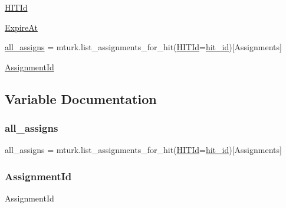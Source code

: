 \begin{DoxyCompactItemize}
\mbox{\hyperlink{namespacedelete__hits_a0db29e7cb8ba641a52d4d38422671994}{H\+I\+T\+Id}}
\item 
\mbox{\hyperlink{namespacedelete__hits_a0e3725708c99cd38fdc53655be3fde4a}{Expire\+At}}
\item 
\mbox{\hyperlink{namespacedelete__hits_a39d5a13a12424291e1fc92872174d3d5}{all\+\_\+assigns}} = mturk.\+list\+\_\+assignments\+\_\+for\+\_\+hit(\mbox{\hyperlink{namespacedelete__hits_a0db29e7cb8ba641a52d4d38422671994}{H\+I\+T\+Id}}=\mbox{\hyperlink{namespacedelete__hits_a8666d258bbc7373ec4916e210f207935}{hit\+\_\+id}})\mbox{[}\textquotesingle{}Assignments\textquotesingle{}\mbox{]}
\item 
\mbox{\hyperlink{namespacedelete__hits_ac8dbc8174bf3d4c67f489b2eec83bee0}{Assignment\+Id}}
\end{DoxyCompactItemize}


\subsection{Variable Documentation}
\mbox{\label{namespacedelete__hits_a39d5a13a12424291e1fc92872174d3d5}} 
\subsubsection{\texorpdfstring{all\_assigns}{all\_assigns}}
{\footnotesize\ttfamily all\+\_\+assigns = mturk.\+list\+\_\+assignments\+\_\+for\+\_\+hit(\mbox{\hyperlink{namespacedelete__hits_a0db29e7cb8ba641a52d4d38422671994}{H\+I\+T\+Id}}=\mbox{\hyperlink{namespacedelete__hits_a8666d258bbc7373ec4916e210f207935}{hit\+\_\+id}})\mbox{[}\textquotesingle{}Assignments\textquotesingle{}\mbox{]}}

\mbox{\label{namespacedelete__hits_ac8dbc8174bf3d4c67f489b2eec83bee0}} 
\subsubsection{\texorpdfstring{AssignmentId}{AssignmentId}}
{\footnotesize\ttfamily Assignment\+Id}

\mbox{\label{namespacedelete__hits_a0e3725708c99cd38fdc53655be3fde4a}} 
